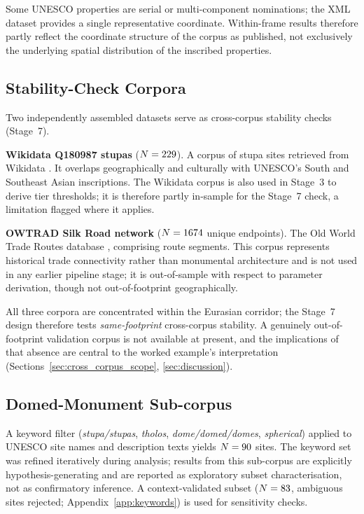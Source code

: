 \documentclass[12pt,a4paper]{article}
\begin{document}
Some UNESCO properties are serial or multi-component nominations; the
XML dataset provides a single representative coordinate. Within-frame
results therefore partly reflect the coordinate structure of the corpus
as published, not exclusively the underlying spatial distribution of
the inscribed properties.

\subsection{Stability-Check Corpora}

Two independently assembled datasets serve as cross-corpus stability
checks (Stage~7).

\textbf{Wikidata Q180987 stupas} ($N = 229$). A corpus of
stupa sites retrieved from Wikidata \citep{tenenbaum2026audit}. It
overlaps geographically and culturally with UNESCO's South and
Southeast Asian inscriptions. The Wikidata corpus is also used in
Stage~3 to derive tier thresholds; it is therefore partly in-sample
for the Stage~7 check, a limitation flagged where it applies.

\textbf{OWTRAD Silk Road network} ($N = 1674$ unique endpoints).
The Old World Trade Routes database \citep{ciolek2004owtrad},
comprising \NOwtradEdges{} route segments. This corpus represents
historical trade connectivity rather than monumental architecture and
is not used in any earlier pipeline stage; it is out-of-sample with
respect to parameter derivation, though not out-of-footprint
geographically.

All three corpora are concentrated within the Eurasian corridor; the
Stage~7 design therefore tests \emph{same-footprint} cross-corpus
stability. A genuinely out-of-footprint validation corpus is not
available at present, and
the implications of that absence are central to the worked example's
interpretation (Sections~\ref{sec:cross_corpus_scope},
\ref{sec:discussion}).

\subsection{Domed-Monument Sub-corpus}
\label{sec:dome_subset}

A keyword filter (\textit{stupa/stupas}, \textit{tholos},
\textit{dome/domed/domes}, \textit{spherical}) applied to UNESCO site
names and description texts yields $N = 90$ sites. The keyword
set was refined iteratively during analysis; results from this
sub-corpus are explicitly hypothesis-generating and are reported as
exploratory subset characterisation, not as confirmatory inference. A
context-validated subset ($N = 83$, \NcircContextRejected{}
ambiguous sites rejected; Appendix~\ref{app:keywords}) is used for
sensitivity checks.
\end{document}
